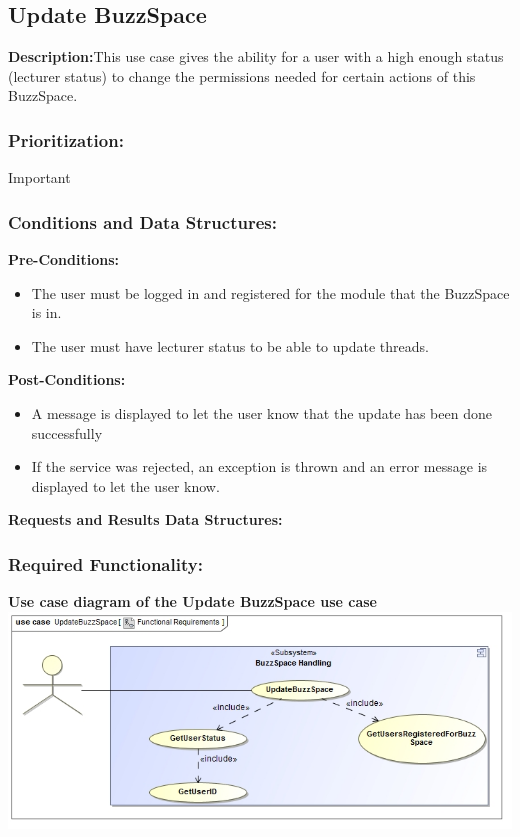 \documentclass[a4paper,11pt]{article}
\begin{document}
\subsection{Update BuzzSpace}
\textbf{Description:}This use case gives the ability for a user with a high enough status (lecturer status) to change the permissions needed for certain actions of this BuzzSpace. 
\subsubsection{Prioritization:} Important
\subsubsection{Conditions and Data Structures:}
\textbf{Pre-Conditions:}
\begin{itemize}
	\item The user must be logged in and registered for the module that the BuzzSpace is in.
	\item The user must have lecturer status to be able to update threads.
\end{itemize}
\textbf{Post-Conditions:}
\begin{itemize}
	\item A message is displayed to let the user know that the update has been done successfully
	\item If the service was rejected, an exception is thrown and an error message is displayed to let the user know.
\end{itemize}
\textbf{Requests and Results Data Structures:}
\subsubsection{Required Functionality:} 
\textbf{Use case diagram of the Update BuzzSpace use case}\\
\includegraphics[width=1\linewidth]{./Images/BuzzSpaceHandling/buzzSpaceUpdate.jpg}\\
\end{document}
